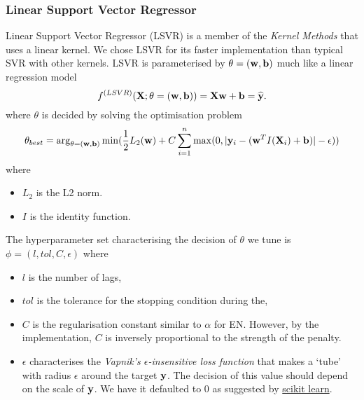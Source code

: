 \subsubsection{Linear Support Vector Regressor}
Linear Support Vector Regressor (LSVR) is a member of the \textit{Kernel Methods} that uses a linear kernel. We chose LSVR for its faster implementation than typical SVR with other kernels. LSVR is parameterised by $\theta = (\mathbf{w}, \mathbf{b})$ much like a linear regression model
\begin{equation*}
    f^{(LSVR)} (\mathbf{X} ; \theta = (\mathbf{w}, \mathbf{b})) = \mathbf{X} \mathbf{w} + \mathbf{b} = \widehat{\mathbf{y}}.
\end{equation*}
where $\theta$ is decided by solving the optimisation problem
\begin{equation*}
    \theta_{best} = \arg_{\theta = (\mathbf{w}, \mathbf{b})} \min (\frac{1}{2} L_2(\mathbf{w}) + C \sum_{i=1}^{n} \max(0, |\mathbf{y}_i - (\mathbf{w}^T I(\mathbf{X}_i) + \mathbf{b})| - \epsilon))
\end{equation*}
where
\begin{itemize}
    \item $L_2$ is the L2 norm.
    \item $I$ is the identity function.
\end{itemize}
The hyperparameter set characterising the decision of $\theta$ we tune is $\phi = (l, tol, C, \epsilon)$ where
\begin{itemize}
    \item $l$ is the number of lags,
    \item $tol$ is the tolerance for the stopping condition during the,
    \item $C$ is the regularisation constant similar to $\alpha$ for EN. However, by the implementation, $C$ is inversely proportional to the strength of the penalty.
    \item $\epsilon$ characterises the \textit{Vapnik's $\epsilon$-insensitive loss function} that makes a `tube' with radius $\epsilon$ around the target $\mathbf{y}$. The decision of this value should depend on the scale of $\mathbf{y}$. We have it defaulted to $0$ as suggested by \href{https://scikit-learn.org/stable/modules/generated/sklearn.svm.LinearSVR.html#sklearn.svm.LinearSVR}{scikit learn}.
\end{itemize}

